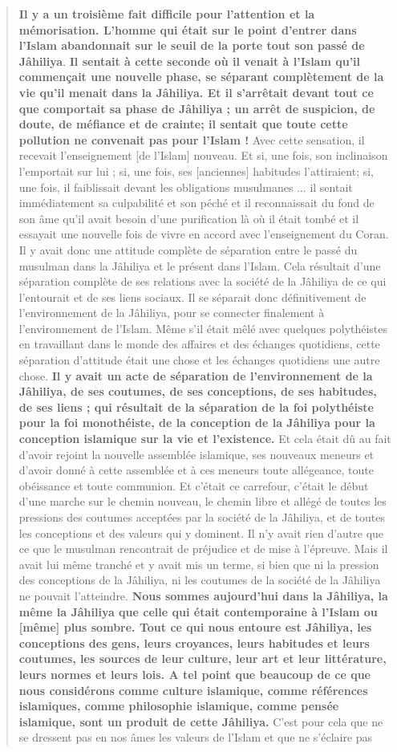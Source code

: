 \begin{quote}
\textbf{Il y a un troisième fait difficile pour l'attention et la
mémorisation. L'homme qui était sur le point d'entrer dans l'Islam
abandonnait sur le seuil de la porte tout son passé de Jâhiliya}.
\textbf{Il sentait à cette seconde où il venait à l'Islam qu'il
commençait une nouvelle phase, se séparant complètement de la vie qu'il
menait dans la Jâhiliya. Et il s'arrêtait devant tout ce que comportait
sa phase de Jâhiliya ; un arrêt de suspicion, de doute, de méfiance et
de crainte; il sentait que toute cette pollution ne convenait pas pour
l'Islam !} Avec cette sensation, il recevait l'enseignement {[}de
l'Islam{]} nouveau. Et si, une fois, son inclinaison l'emportait sur lui
; si, une fois, ses {[}anciennes{]} habitudes l'attiraient; si, une
fois, il faiblissait devant les obligations musulmanes ... il sentait
immédiatement sa culpabilité et son péché et il reconnaissait du fond de
son âme qu'il avait besoin d'une purification là où il était tombé et il
essayait une nouvelle fois de vivre en accord avec l'enseignement du
Coran. Il y avait donc une attitude complète de séparation entre le
passé du musulman dans la Jâhiliya et le présent dans l'Islam. Cela
résultait d'une séparation complète de ses relations avec la société de
la Jâhiliya de ce qui l'entourait et de ses liens sociaux. Il se
séparait donc définitivement de l'environnement de la Jâhiliya, pour se
connecter finalement à l'environnement de l'Islam. Même s'il était mêlé
avec quelques polythéistes en travaillant dans le monde des affaires et
des échanges quotidiens, cette séparation d'attitude était une chose et
les échanges quotidiens une autre chose. \textbf{Il y avait un acte de
séparation de l'environnement de la Jâhiliya, de ses coutumes, de ses
conceptions, de ses habitudes, de ses liens ; qui résultait de la
séparation de la foi polythéiste pour la foi monothéiste, de la
conception de la Jâhiliya pour la conception islamique sur la vie et
l'existence.} Et cela était dû au fait d'avoir rejoint la nouvelle
assemblée islamique, ses nouveaux meneurs et d'avoir donné à cette
assemblée et à ces meneurs toute allégeance, toute obéissance et toute
communion. Et c'était ce carrefour, c'était le début d'une marche sur le
chemin nouveau, le chemin libre et allégé de toutes les pressions des
coutumes acceptées par la société de la Jâhiliya, et de toutes les
conceptions et des valeurs qui y dominent. Il n'y avait rien d'autre que
ce que le musulman rencontrait de préjudice et de mise à l'épreuve. Mais
il avait lui même tranché et y avait mis un terme, si bien que ni la
pression des conceptions de la Jâhiliya, ni les coutumes de la société
de la Jâhiliya ne pouvait l'atteindre. \textbf{Nous sommes aujourd'hui
dans la Jâhiliya, la même la Jâhiliya que celle qui était contemporaine
à l'Islam ou {[}même{]} plus sombre. Tout ce qui nous entoure est
Jâhiliya, les conceptions des gens, leurs croyances, leurs habitudes et
leurs coutumes, les sources de leur culture, leur art et leur
littérature, leurs normes et leurs lois. A tel point que beaucoup de ce
que nous considérons comme culture islamique, comme références
islamiques, comme philosophie islamique, comme pensée islamique, sont un
produit de cette Jâhiliya.} C'est pour cela que ne se dressent pas en
nos âmes les valeurs de l'Islam et que ne s'éclaire pas


\end{quote}

